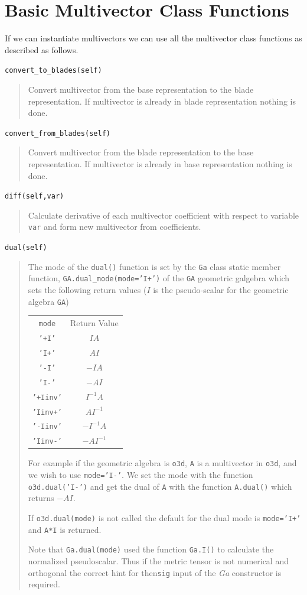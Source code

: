 \documentclass[12pt]{report}
\newcommand{\T}[1]{\texttt{#1}}
\begin{document}
\section{Basic Multivector Class Functions}

If we can instantiate multivectors we can use all the multivector class functions as described as follows.

\T{convert\_to\_blades(self)}
\begin{quote}
   Convert multivector from the base representation to the blade representation.
   If multivector is already in blade representation nothing is done.
\end{quote}

\T{convert\_from\_blades(self)}
\begin{quote}
   Convert multivector from the blade representation to the base representation.
   If multivector is already in base representation nothing is done.
\end{quote}

\T{diff(self,var)}
\begin{quote}
   Calculate derivative of each multivector coefficient with respect to
   variable \T{var} and form new multivector from coefficients.
\end{quote}

\T{dual(self)}
\begin{quote}
   The mode of the \T{dual()} function is set by the \T{Ga} class static member function, \T{GA.dual\_mode(mode='I+')} of the \T{GA} geometric
   galgebra which sets the following return values ($I$ is the pseudo-scalar for the geometric algebra \T{GA})
   \begin{center}
   \begin{tabular}{cc}
        \T{mode} & Return Value \\
        \T{'+I'} & $IA$ \\
        \T{'I+'} & $AI$ \\
        \T{'-I'} & $-IA$ \\
        \T{'I-'} & $-AI$ \\
        \T{'+Iinv'} & $I^{-1}A$ \\
        \T{'Iinv+'} & $AI^{-1}$ \\
        \T{'-Iinv'} & $-I^{-1}A$ \\
        \T{'Iinv-'} & $-AI^{-1}$
   \end{tabular}
   \end{center}

   For example if the geometric algebra is \T{o3d}, \T{A} is a multivector in \T{o3d}, and we wish to use \T{mode='I-'}.  We set
   the mode with the function
   \T{o3d.dual('I-')} and get the dual of \T{A} with the function \T{A.dual()} which returns $-AI$.

   If \T{o3d.dual(mode)} is not called the default for the dual mode is \T{mode='I+'} and \T{A*I} is returned.
   
   Note that \T{Ga.dual(mode)} used the function \T{Ga.I()} to calculate the normalized pseudoscalar.  Thus if the metric tensor is
   not numerical and orthogonal the correct hint for then\T{sig} input of the \emph{Ga} constructor is required. 
\end{quote}
\end{document}
